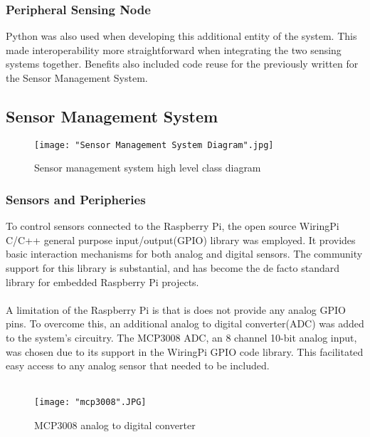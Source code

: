 \documentclass{article}
\begin{document}
\subsubsection{Peripheral Sensing Node}
Python was also used when developing this additional entity of the system. This made interoperability more straightforward when integrating the two sensing systems together. Benefits also included code reuse for the previously written for the Sensor Management System. 

\newpage
\subsection{Sensor Management System}

\begin{figure}[H]
\centering
\texttt{[image: "Sensor Management System Diagram".jpg]}
\caption{Sensor management system high level class diagram\label{overflow}}
\label{fig:sms_high_level_arch}
\end{figure}

\subsubsection{Sensors and Peripheries}
To control sensors connected to the Raspberry Pi, the open source WiringPi C/C++ general purpose input/output(GPIO) library was employed. It provides basic interaction mechanisms for both analog and digital sensors. The community support for this library is substantial, and has become the de facto standard library for embedded Raspberry Pi projects. \\\\
A limitation of the Raspberry Pi is that is does not provide any analog GPIO pins. To overcome this, an additional analog to digital converter(ADC) was added to the system’s circuitry. The MCP3008 ADC, an 8 channel 10-bit analog input,  was chosen due to its support in the WiringPi GPIO code library. This facilitated easy access to any analog sensor that needed to be included. \\\\

\begin{figure}[H]
\centering
\texttt{[image: "mcp3008".JPG]}
\caption{MCP3008 analog to digital converter}
\label{fig:hard_adc}
\end{figure}
\end{document}
